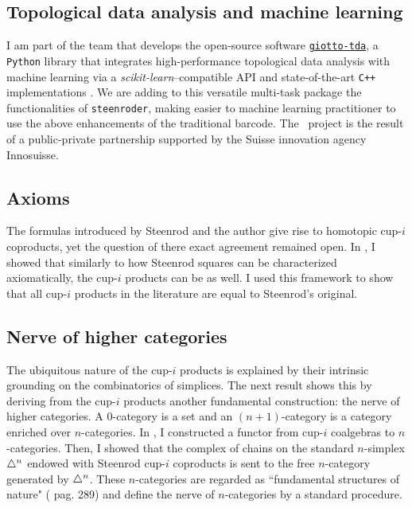 \subsection{Topological data analysis and machine learning} \label{ss:giotto}

I am part of the team that develops the open-source software \href{https://giotto-ai.github.io/gtda-docs/latest/library.html}{\texttt{giotto-tda}}, a \texttt{Python} library that integrates high-performance topological data analysis with machine learning via a \emph{scikit-learn}--compatible API and state-of-the-art \texttt{C++} implementations \cite{medina2021giotto}.
We are adding to this versatile multi-task package the functionalities of \texttt{steenroder}, making easier to machine learning practitioner to use the above enhancements of the traditional barcode.
The \giottoTDA\ project is the result of a public-private partnership supported by the Suisse innovation agency Innosuisse.

\subsection{Axioms}

The formulas introduced by Steenrod and the author give rise to homotopic cup-$i$ coproducts, yet the question of there exact agreement remained open.
In \cite{medina2022axiomatic}, I showed that similarly to how Steenrod squares can be characterized axiomatically, the cup-$i$ products can be as well.
I used this framework to show that all cup-$i$ products in the literature are equal to Steenrod's original.

\subsection{Nerve of higher categories} \label{ss:nerve}

The ubiquitous nature of the cup-$i$ products is explained by their intrinsic grounding on the combinatorics of simplices.
The next result shows this by deriving from the cup-$i$ products another fundamental construction: the nerve of higher categories.
A $0$-category is a set and an $(n+1)$-category is a category enriched over $n$-categories.
In \cite{medina2020globular}, I constructed a functor from cup-$i$ coalgebras to $n$-categories.
Then, I showed that the complex of chains on the standard $n$-simplex $\triangle^n$ endowed with Steenrod cup-$i$ coproducts is sent to the free $n$-category generated by $\triangle^n$.
These $n$-categories are regarded as ``fundamental structures of nature" (\cite{street1987orientals} pag. 289) and define the nerve of $n$-categories by a standard procedure.

